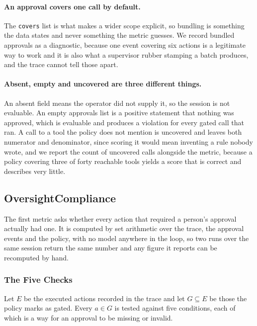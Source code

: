 \documentclass[11pt,a4paper]{article}
\begin{document}
\paragraph{An approval covers one call by default.} The \texttt{covers} list is what
makes a wider scope explicit, so bundling is something the data states and never
something the metric guesses. We record bundled approvals as a diagnostic, because
one event covering six actions is a legitimate way to work and it is also what a
supervisor rubber stamping a batch produces, and the trace cannot tell those apart.

\paragraph{Absent, empty and uncovered are three different things.} An absent field
means the operator did not supply it, so the session is not evaluable. An empty
approvals list is a positive statement that nothing was approved, which is evaluable
and produces a violation for every gated call that ran. A call to a tool the policy
does not mention is uncovered and leaves both numerator and denominator, since
scoring it would mean inventing a rule nobody wrote, and we report the count of
uncovered calls alongside the metric, because a policy covering three of forty
reachable tools yields a score that is correct and describes very little.

\subsection{OversightCompliance}
\label{sec:oversight}

The first metric asks whether every action that required a person's approval
actually had one. It is computed by set arithmetic over the trace, the approval
events and the policy, with no model anywhere in the loop, so two runs over the same
session return the same number and any figure it reports can be recomputed by hand.

\subsubsection{The Five Checks}

Let $E$ be the executed actions recorded in the trace and let $G \subseteq E$ be
those the policy marks as gated. Every $a \in G$ is tested against five conditions,
each of which is a way for an approval to be missing or invalid.
\end{document}
